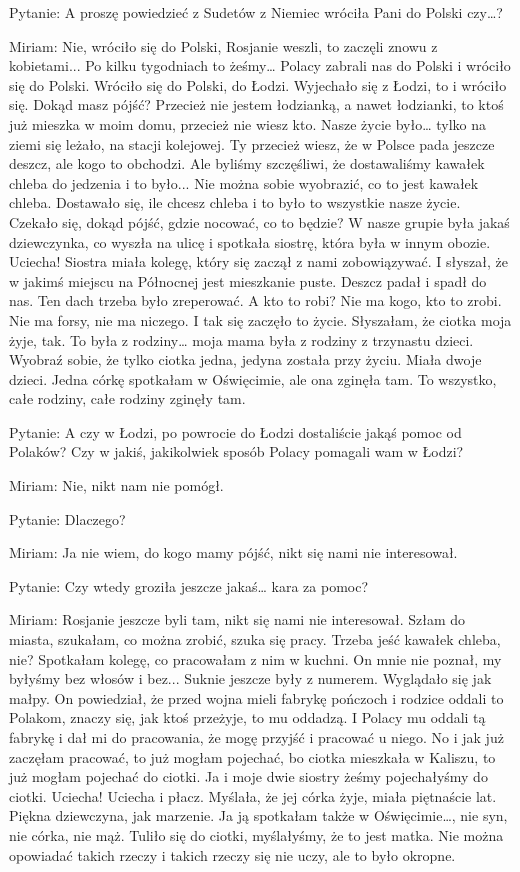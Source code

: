  

Pytanie: A proszę powiedzieć z Sudetów z Niemiec wróciła Pani do Polski czy…? 

Miriam: Nie, wróciło się do Polski, Rosjanie weszli, to zaczęli znowu z kobietami... Po kilku tygodniach to żeśmy… Polacy zabrali nas do Polski i wróciło się do Polski. Wróciło się do Polski, do Łodzi. Wyjechało się z Łodzi, to i wróciło się.  Dokąd masz pójść? Przecież nie jestem łodzianką, a nawet łodzianki, to ktoś już mieszka w moim domu, przecież nie wiesz kto. Nasze życie było… tylko na ziemi się leżało, na stacji kolejowej. Ty przecież wiesz, że w Polsce pada jeszcze deszcz, ale kogo to obchodzi. Ale byliśmy szczęśliwi, że dostawaliśmy kawałek chleba do jedzenia i to było... Nie można sobie wyobrazić, co to jest kawałek chleba. Dostawało się, ile chcesz chleba i to było to wszystkie nasze życie. Czekało się, dokąd pójść, gdzie nocować, co to będzie? W nasze grupie była jakaś dziewczynka, co wyszła na ulicę i spotkała siostrę, która była w innym obozie. Uciecha! Siostra miała kolegę, który się zaczął z nami zobowiązywać. I słyszał, że w jakimś miejscu na Północnej jest mieszkanie puste. Deszcz padał i spadł do nas. Ten dach trzeba było zreperować. A kto to robi? Nie ma kogo, kto to zrobi. Nie ma forsy, nie ma niczego. I tak się zaczęło to życie. Słyszałam, że ciotka moja żyje, tak. To była z rodziny… moja mama była z rodziny z trzynastu dzieci. Wyobraź sobie, że tylko ciotka jedna, jedyna została przy życiu. Miała dwoje dzieci. Jedna córkę spotkałam w Oświęcimie, ale ona zginęła tam. To wszystko, całe rodziny, całe rodziny zginęły tam. 

 

Pytanie: A czy w Łodzi, po powrocie do Łodzi dostaliście jakąś pomoc od Polaków? Czy w jakiś, jakikolwiek sposób Polacy pomagali wam w Łodzi? 

Miriam: Nie, nikt nam nie pomógł. 

Pytanie: Dlaczego? 

Miriam: Ja nie wiem, do kogo mamy pójść, nikt się nami nie interesował. 

 

Pytanie: Czy wtedy groziła jeszcze jakaś… kara za pomoc? 

Miriam: Rosjanie jeszcze byli tam, nikt się nami nie interesował. Szłam do miasta, szukałam, co można zrobić, szuka się pracy. Trzeba jeść kawałek chleba, nie? Spotkałam kolegę, co pracowałam z nim w kuchni. On mnie nie poznał, my byłyśmy bez włosów i bez... Suknie jeszcze były z numerem. Wyglądało się jak małpy. On powiedział, że przed wojna mieli fabrykę pończoch i rodzice oddali to Polakom, znaczy się, jak ktoś przeżyje, to mu oddadzą. I Polacy mu oddali tą fabrykę i dał mi do pracowania, że mogę przyjść i pracować u niego. No i jak już zaczęłam pracować, to już mogłam pojechać, bo ciotka mieszkała w Kaliszu, to już mogłam pojechać do ciotki. Ja i moje dwie siostry żeśmy pojechałyśmy do ciotki. Uciecha! Uciecha i płacz. Myślała, że jej córka żyje, miała piętnaście lat. Piękna dziewczyna, jak marzenie. Ja ją spotkałam także w Oświęcimie…, nie syn, nie córka, nie mąż. Tuliło się do ciotki, myślałyśmy, że to jest matka. Nie można opowiadać takich rzeczy i takich rzeczy się nie uczy, ale to było okropne. 

